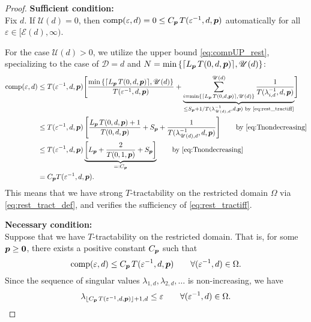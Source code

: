 \documentclass[sort&compress]{elsarticle}
\newcommand{\thed}{\mathscr{D}}
\newcommand{\theM}{\mathscr{E}}
\newcommand{\theUB}{\mathscr{U}}
\begin{document}
\begin{proof}
    \textbf{Sufficient condition:}\\
Fix $d$.  If $\theUB(d) = 0$, then $\operatorname{comp}(\varepsilon,d) = 0 \le C_{\boldsymbol{p}}\, T(\varepsilon^{-1},d,\boldsymbol{p})$ automatically for all $\varepsilon \in [\theM(d), \infty)$.

For the case $\theUB(d)> 0$, we utilize the upper bound \eqref{eq:compUP_rest}, specializing to the case of $\thed=d$ and $N = \min\left\{\lceil L_{\vp}\, T(0,d,\vp)\rceil,\theUB(d)\right\}$:
\begin{align*}
       \comp(\varepsilon,d)
       & \le T(\varepsilon^{-1},d, \vp) \Biggl [ \frac{\min\left\{\lceil L_{\vp}\, T(0,d,\vp)\rceil,\theUB(d)\right\}}{T(\varepsilon^{-1},d, \vp)}  + \underbrace{\sum_{i = \min\left\{\lceil L_{\vp}\, T(0,d,\vp)\rceil,\theUB(d)\right\}}^{\theUB(d)} \frac{1}{T(\lambda_{i, d}^{-1},d,\vp)}}_{\le S_{\vp} + 1/ T(\lambda_{\theUB(d), d}^{-1},d,\vp) \text{ by \eqref{eq:rest_tractiff}}} 
        \Biggr] \\
       & \le T(\varepsilon^{-1},d,\vp)\left[\frac{ L_{\vp}\, T(0,d,\vp)+1}{T(0,d, \vp)} + S_{\vp} + \frac{1}{T(\lambda_{\theUB(d), d}^{-1},d,\vp)} \right]
       \qquad \text{by \eqref{eq:Tnondecreasing}}\\
       & \le T(\varepsilon^{-1},d,\vp) \underbrace{\left[L_{\vp} + \frac{2}{T(0,1, \vp)} + S_{\vp} \right]}_{=:C_{\vp}}
       \qquad \text{by \eqref{eq:Tnondecreasing}}\\
       & =  C_{\vp}T(\varepsilon^{-1},d,\vp).
\end{align*}
This means that we have strong $T$-tractability on the restricted domain $\Omega$ via \eqref{eq:rest_tract_def}, and verifies the sufficiency of \eqref{eq:rest_tractiff}.


\bigskip

\noindent \textbf{Necessary condition:}\\
Suppose that we have
$T$-tractability on the restricted domain. That is, for some $\boldsymbol{p} \ge \boldsymbol{0}$, there exists a positive constant $C_{\boldsymbol{p}}$ such that
\[
\operatorname{comp}(\varepsilon,d)\le C_{\boldsymbol{p}}\, T(\varepsilon^{-1},d,\boldsymbol{p}) \qquad \forall (\varepsilon^{-1}, d) \in \Omega.
\]
Since the sequence of singular values $\lambda_{1,d}, \lambda_{2,d}, \ldots $ is non-increasing, we have
\begin{equation}\label{eq:rest_lambda_K4}
	\lambda_{\lfloor C_{\boldsymbol{p}}\, T(\varepsilon^{-1},d,\boldsymbol{p})\rfloor +1,d}\le \varepsilon \qquad
 \forall (\varepsilon^{-1}, d) \in \Omega.
\end{equation}


\end{proof}
\end{document}
